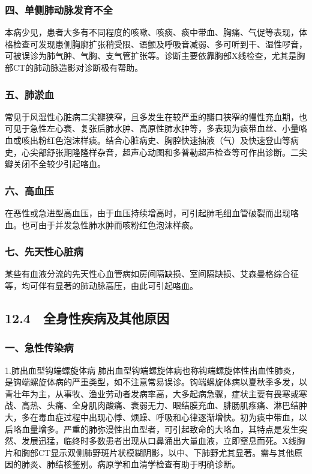 \subsubsection{四、单侧肺动脉发育不全}

本病少见，患者大多有不同程度的咳嗽、咳痰、痰中带血、胸痛、气促等表现，体格检查可发现患侧胸廓扩张稍受限、语颤及呼吸音减弱、多可听到干、湿性啰音，可被误诊为肺气肿、气胸、支气管扩张等。诊断主要依靠胸部X线检查，尤其是胸部CT的肺动脉造影对诊断极有帮助。

\subsubsection{五、肺淤血}

常见于风湿性心脏病二尖瓣狭窄，且多发生在较严重的瓣口狭窄的慢性充血期，也可见于急性左心衰、复张后肺水肿、高原性肺水肿等，多表现为痰带血丝、小量咯血或咳出粉红色泡沫样痰。结合心脏病史、胸腔快速抽液（气）及快速登山等病史，心尖部舒张期隆隆样杂音，超声心动图和多普勒超声检查等可作出诊断。二尖瓣关闭不全较少引起咯血。

\subsubsection{六、高血压}

在恶性或急进型高血压，由于血压持续增高时，可引起肺毛细血管破裂而出现咯血。也可由于并发急性肺水肿而咳粉红色泡沫样痰。

\subsubsection{七、先天性心脏病}

某些有血液分流的先天性心血管病如房间隔缺损、室间隔缺损、艾森曼格综合征等，均可伴有显著的肺动脉高压，由此可引起咯血。

\protect\hypertarget{text00060.html}{}{}

\subsection{12.4　全身性疾病及其他原因}

\subsubsection{一、急性传染病}

1.肺出血型钩端螺旋体病
肺出血型钩端螺旋体病也称钩端螺旋体性出血性肺炎，是钩端螺旋体病的严重类型，如不注意常易误诊。钩端螺旋体病以夏秋季多发，以青壮年为主，从事牧、渔业劳动者发病率高，大多起病急骤，症状主要有畏寒或寒战、高热、头痛、全身肌肉酸痛、衰弱无力、眼结膜充血、腓肠肌疼痛、淋巴结肿大，多在毒血症过程中出现心悸、烦躁、呼吸和心律逐渐增快。初为痰中带血，以后咯血量增多。严重的肺弥漫性出血型者，可引起致命的大咯血，其特点是发生突然、发展迅猛，临终时多数患者出现从口鼻涌出大量血液，立即窒息而死。X线胸片和胸部CT显示双侧肺野斑片状模糊阴影，以中、下肺野尤其显著。需与其他原因的肺炎、肺结核鉴别。病原学和血清学检查有助于明确诊断。

